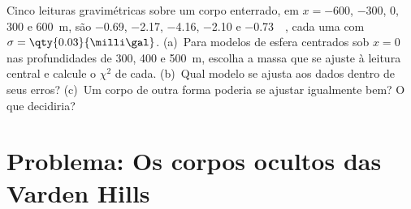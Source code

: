 \begin{exercise}[$\star\star\star$]\label{exo:b3:field-lab-methods-3:12}
Cinco leituras gravimétricas sobre um corpo enterrado, em $x = -600$, $-300$, $0$,
$300$ e \qty{600}{m}, são \num{-0.69}, \num{-2.17}, \num{-4.16},
\num{-2.10} e \qty{-0.73}{\milli\gal}, cada uma com $\sigma =
\qty{0.03}{\milli\gal}$. (a)~Para modelos de esfera centrados sob $x = 0$ nas
profundidades de \num{300}, \num{400} e \qty{500}{m}, escolha a massa que
se ajuste à leitura central e calcule o  $\chi^2$ de cada. (b)~Qual
modelo se ajusta aos dados dentro de seus erros? (c)~Um corpo de outra forma poderia
se ajustar igualmente bem? O que decidiria?
\end{exercise}

\section{Problema: Os corpos ocultos das Varden Hills}

